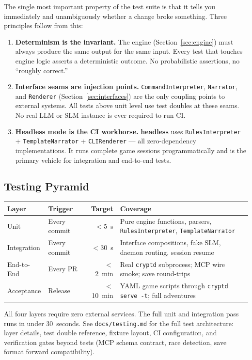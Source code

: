 \documentclass[a4paper,10pt]{article}
\newcommand{\iface}[1]{\texttt{#1}}
\newcommand{\cmd}[1]{\texttt{#1}}
\newcommand{\mode}[1]{\textbf{#1}}
\begin{document}
The single most important property of the test suite is that it tells
you immediately and unambiguously whether a change broke something.
Three principles follow from this:

\begin{enumerate}[label=\textbf{P\arabic*}.]
  \item \textbf{Determinism is the invariant.}
    The engine (Section~\ref{sec:engine}) must always produce the
    same output for the same input.  Every test that touches engine
    logic asserts a deterministic outcome.  No probabilistic
    assertions, no ``roughly correct.''
  \item \textbf{Interface seams are injection points.}
    \iface{CommandInterpreter}, \iface{Narrator}, and
    \iface{Renderer} (Section~\ref{sec:interfaces}) are the only
    coupling points to external systems.  All tests above unit level
    use test doubles at these seams.  No real LLM or SLM
    instance is ever required to run CI.
  \item \textbf{Headless mode is the CI workhorse.}
    \mode{headless} uses \texttt{RulesInterpreter} +
    \texttt{TemplateNarrator} + \texttt{CLIRenderer} --- all
    zero-dependency implementations.  It runs complete game sessions
    programmatically and is the primary vehicle for integration and
    end-to-end tests.
\end{enumerate}

\subsection{Testing Pyramid}

\begin{center}
\begin{tabular}{llrp{5.5cm}}
\toprule
\textbf{Layer} & \textbf{Trigger} & \textbf{Target} & \textbf{Coverage} \\
\midrule
Unit           & Every commit & $<$5~s   & Pure engine functions, parsers, \texttt{RulesInterpreter}, \texttt{TemplateNarrator} \\
Integration    & Every commit & $<$30~s  & Interface compositions, fake SLM, daemon routing, session resume \\
End-to-End     & Every PR     & $<$2~min & Real \cmd{cryptd} subprocess; MCP wire smoke; save round-trips \\
Acceptance     & Release      & $<$10~min & YAML game scripts through \cmd{cryptd serve -t}; full adventures \\
\bottomrule
\end{tabular}
\end{center}

All four layers require zero external services.  The full unit and
integration pass runs in under 30~seconds.  See
\texttt{docs/testing.md} for the full test architecture: layer
details, test double reference, fixture layout, CI configuration,
and verification gates beyond tests (MCP schema contract, race
detection, save format forward compatibility).
\end{document}
